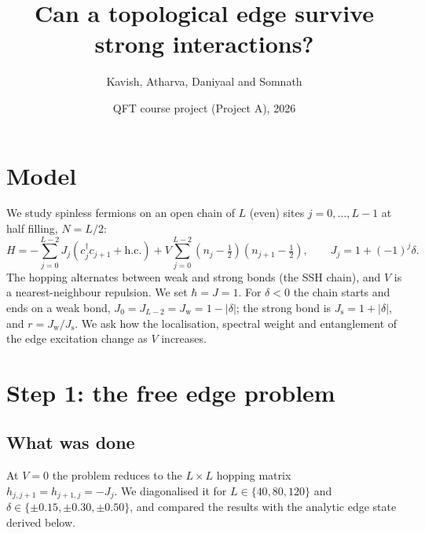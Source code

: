\documentclass[11pt,a4paper]{article}
\title{Can a topological edge survive strong interactions?}
\author{Kavish, Atharva, Daniyaal and Somnath}
\date{QFT course project (Project A), 2026}
\newcommand{\Jw}{J_{\mathrm{w}}}
\newcommand{\Js}{J_{\mathrm{s}}}
\newcommand{\dg}{^{\dagger}}
\begin{document}
\maketitle
\tableofcontents

\section{Model}
\label{sec:model}

We study spinless fermions on an open chain of $L$ (even) sites $j=0,\dots,L-1$ at half filling, $N=L/2$:
\begin{equation}
  H = -\sum_{j=0}^{L-2} J_j \left(c_j\dg c_{j+1} + \text{h.c.}\right)
      + V \sum_{j=0}^{L-2} \left(n_j - \tfrac12\right)\left(n_{j+1} - \tfrac12\right),
  \qquad J_j = 1 + (-1)^j \delta .
  \label{eq:H}
\end{equation}
The hopping alternates between weak and strong bonds (the SSH chain), and $V$ is a nearest-neighbour repulsion.
We set $\hbar = J = 1$.
For $\delta<0$ the chain starts and ends on a weak bond, $J_0 = J_{L-2} = \Jw = 1-|\delta|$; the strong bond is $\Js = 1+|\delta|$, and $r = \Jw/\Js$.
We ask how the localisation, spectral weight and entanglement of the edge excitation change as $V$ increases.

\section{Step 1: the free edge problem}
\label{sec:step1}

\subsection{What was done}

At $V=0$ the problem reduces to the $L\times L$ hopping matrix $h_{j,j+1} = h_{j+1,j} = -J_j$.
We diagonalised it for $L\in\{40,80,120\}$ and $\delta\in\{\pm0.15,\pm0.30,\pm0.50\}$, and compared the results with the analytic edge state derived below.
\end{document}
